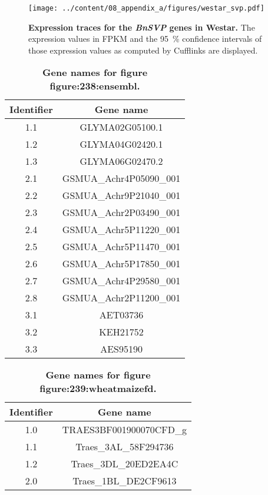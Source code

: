 \documentclass[12pt,]{book}
\begin{document}
\begin{figure}[htbp]
\centering
\texttt{[image: ../content/08\_appendix\_a/figures/westar\_svp.pdf]}
\caption{\textbf{Expression traces for the \emph{BnSVP} genes in
Westar.} The expression values in FPKM and the 95~\% confidence
intervals of those expression values as computed by Cufflinks are
displayed.}\label{appendixa:svp}
\end{figure}

\begin{table}[htp]
\caption{\textbf{Gene names for figure figure:238:ensembl.}}
\label{appendix:figure238table}
\begin{center}
\begin{tabular}{cc}
\toprule
Identifier & Gene name \\
\midrule
1.1 & GLYMA02G05100.1       \\
1.2 & GLYMA04G02420.1       \\
1.3 & GLYMA06G02470.2       \\
2.1 & GSMUA\_Achr4P05090\_001 \\
2.2 & GSMUA\_Achr9P21040\_001 \\
2.3 & GSMUA\_Achr2P03490\_001 \\
2.4 & GSMUA\_Achr5P11220\_001 \\
2.5 & GSMUA\_Achr5P11470\_001 \\
2.6 & GSMUA\_Achr5P17850\_001 \\
2.7 & GSMUA\_Achr4P29580\_001 \\
2.8 & GSMUA\_Achr2P11200\_001 \\
3.1 & AET03736              \\
3.2 & KEH21752              \\
3.3 & AES95190              \\
\bottomrule
\end{tabular}
\end{center}
\end{table}\begin{table}[htp]
\caption{\textbf{Gene names for figure figure:239:wheatmaizefd.}}
\label{appendix:figure239wheatmaizefd}
\begin{center}
\begin{tabular}{cc}
\toprule
Identifier & Gene name \\
\midrule
1.0  & TRAES3BF001900070CFD\_g \\
1.1  & Traes\_3AL\_58F294736    \\
1.2  & Traes\_3DL\_20ED2EA4C    \\
2.0  & Traes\_1BL\_DE2CF9613    \\

\end{tabular}
\end{center}
\end{table}
\end{document}
